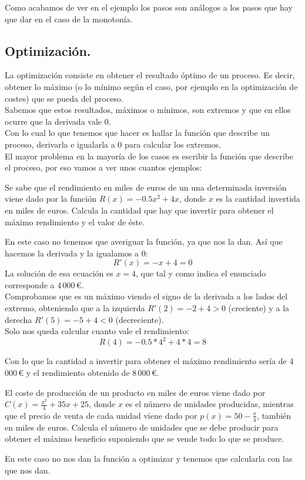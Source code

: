 \documentclass[a4paper,11pt,answers]{exam}
\begin{document}
\begin{questions}
Como acabamos de ver en el ejemplo los pasos son análogos a los pasos que hay que dar en el caso de la monotonía.

\subsection{Optimización.}
La optimización consiste en obtener el resultado óptimo de un proceso. Es decir, obtener lo máximo (o lo mínimo según el caso, por ejemplo en la optimización de costes) que se pueda del proceso.\\

Sabemos que estos resultados, máximos o mínimos, son extremos y que en ellos ocurre que la derivada vale 0.\\
Con lo cual lo que tenemos que hacer es hallar la función que describe un proceso, derivarla e igualarla a 0 para calcular los extremos.\\

El mayor problema en la mayoría de los casos es escribir la función que describe el proceso, por eso vamos a ver unos cuantos ejemplos:
\begin{questions}
\question Se sabe que el rendimiento en miles de euros de un una determinada inversión viene dado por la función $R(x) = -0.5x^2 + 4x$, donde $x$ es la cantidad invertida en miles de euros. Calcula la cantidad que hay que invertir para obtener el máximo rendimiento y el valor de éste.
\begin{solution}
En este caso no tenemos que averiguar la función, ya que nos la dan. Así que hacemos la derivada y la igualamos a 0:
\[R'(x) = -x + 4 = 0\]
La solución de esa ecuación es $x=4$, que tal y como indica el enunciado corresponde a 4\,000\,€.\\
Comprobamos que es un máximo viendo el signo de la derivada a los lados del extremo, obteniendo que a la izquierda $R'(2) =-2 + 4>0$ (creciente) y a la derecha $R'(5) = -5+4 <0$ (decreciente).\\

Solo nos queda calcular cuanto vale el rendimiento:
\[R(4) = -0.5*4^2 + 4*4 = 8\]

Con lo que la cantidad a invertir para obtener el máximo rendimiento sería de 4\,000\,€ y el rendimiento obtenido de 8\,000\,€.
\end{solution}
\question El coste de producción de un producto en miles de euros viene dado por $C(x) = \frac{x^2}{4} + 35x + 25$, donde $x$ es el número de unidades producidas, mientras que el precio de venta de cada unidad viene dado por $p(x) = 50- \frac{x}{4}$, también en miles de euros. Calcula el número de unidades que se debe producir para obtener el máximo beneficio suponiendo que se vende todo lo que se produce.
\begin{solution}
En este caso no nos dan la función a optimizar y tenemos que calcularla con las que nos dan.\\


\end{solution}
\end{questions}
\end{questions}
\end{document}
